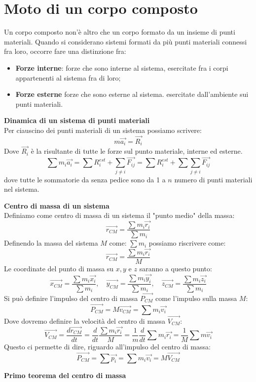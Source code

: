 \documentclass[a4paper,12pt]{article}
\begin{document}
\section{Moto di un corpo composto}
Un corpo composto non'è altro che un corpo formato da un insieme di punti materiali. Quando si considerano sistemi
formati da più punti materiali connessi fra loro, occorre fare una distinzione fra:
\begin{itemize}
  \item \textbf{Forze interne}: forze che sono interne al sistema, esercitate fra i corpi appartenenti al sistema fra di loro;
  \item \textbf{Forze esterne} forze che sono esterne al sistema. esercitate dall'ambiente sui punti materiali.
\end{itemize}
\par\smallskip
\textbf{Dinamica di un sistema di punti materiali} \\
Per ciauscino dei punti materiali di un sistema possiamo scrivere:
$$ m\vec{a_i} = \vec{R_i} $$
Dove $\vec{R_i}$ è la risultante di tutte le forze sul punto materiale, interne ed esterne.
$$ \sum m_i\vec{a_i} = \sum R^{est}_i+ \sum_{j \neq i} \vec{F_{ij}} = \sum R^{est}_i + \sum \sum_{j \neq i} \vec{F_{ij}} $$
dove tutte le sommatorie da senza pedice sono da 1 a $n$ numero di punti materiali nel sistema.
\par\smallskip
\textbf{Centro di massa di un sistema} \\
Definiamo come centro di massa di un sistema il "punto medio" della massa:
$$ \vec{r_{CM}} = \frac{\sum m_i\vec{r_i}}{\sum m_i} $$
Definendo la massa del sistema $M$ come: $\sum m_i$ possiamo riscrivere come:
$$ \vec{r_{CM}} = \frac{\sum m_i\vec{r_i}}{M} $$
Le coordinate del punto di massa su $x,y$ e $z$ saranno a questo punto:
$$ \vec{x_{CM}} = \frac{\sum m_i\vec{x_i}}{\sum m_i}, \quad \vec{y_{CM}} = \frac{\sum m_i\vec{y_i}}{\sum m_i}, \quad \vec{z_{CM}} = \frac{\sum m_i\vec{z_i}}{\sum m_i} $$
Si può definire l'impulso del centro di massa $\vec{P_{CM}}$ come l'impulso sulla massa $M$:
$$ \vec{P_{CM}} = M\vec{v_{CM}} = \sum m_i\vec{v_i}$$
Dove dovremo definire la velocità del centro di massa $\vec{V_{CM}}$:
$$ \vec{V_{CM}} =  \frac{d\vec{r_{CM}}}{dt} = \frac{d}{dt} \frac{\sum m_i\vec{r_i}}{M} = \frac{1}{m}\frac{d}{dt}\sum m_i\vec{r_i} = \frac{1}{M} \sum m\vec{v_i} $$
Questo ci permette di dire, riguardo all'impulso del centro di massa:
$$ \vec{P_{CM}} = \sum \vec{p_i} = \sum m_i\vec{v_i} = M\vec{V_{CM}}$$
\par\smallskip
\textbf{Primo teorema del centro di massa} \\
\end{document}
